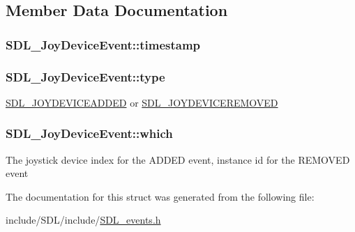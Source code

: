 \subsection{Member Data Documentation}
\hypertarget{struct_s_d_l___joy_device_event_a5c4a9271bfff5d5c2e09a0dc732df8f3}{
\subsubsection[{timestamp}]{ S\-D\-L\-\_\-\-Joy\-Device\-Event\-::timestamp}}\label{struct_s_d_l___joy_device_event_a5c4a9271bfff5d5c2e09a0dc732df8f3}
\hypertarget{struct_s_d_l___joy_device_event_a51f060ba1dd5669b458e9c97aece667e}{
\subsubsection[{type}]{ S\-D\-L\-\_\-\-Joy\-Device\-Event\-::type}}\label{struct_s_d_l___joy_device_event_a51f060ba1dd5669b458e9c97aece667e}
\hyperlink{_s_d_l__events_8h_a3b589e89be6b35c02e0dd34a55f3fccaa0500c4e830a1822e6d0a90294c3f1393}{S\-D\-L\-\_\-\-J\-O\-Y\-D\-E\-V\-I\-C\-E\-A\-D\-D\-E\-D} or \hyperlink{_s_d_l__events_8h_a3b589e89be6b35c02e0dd34a55f3fccaa4e2d7a1067dc56abeee393d46309ecd0}{S\-D\-L\-\_\-\-J\-O\-Y\-D\-E\-V\-I\-C\-E\-R\-E\-M\-O\-V\-E\-D} \hypertarget{struct_s_d_l___joy_device_event_af9b295798f033b799ebbda7de6cb5a7e}{
\subsubsection[{which}]{ S\-D\-L\-\_\-\-Joy\-Device\-Event\-::which}}\label{struct_s_d_l___joy_device_event_af9b295798f033b799ebbda7de6cb5a7e}
The joystick device index for the A\-D\-D\-E\-D event, instance id for the R\-E\-M\-O\-V\-E\-D event 

The documentation for this struct was generated from the following file\-:\begin{DoxyCompactItemize}
\item 
include/\-S\-D\-L/include/\hyperlink{_s_d_l__events_8h}{S\-D\-L\-\_\-events.\-h}\end{DoxyCompactItemize}
